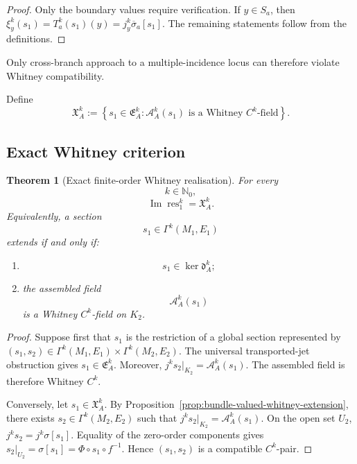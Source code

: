 \documentclass[11pt]{article}
\theoremstyle{plain}
\newtheorem{theorem}{Theorem}[section]
\theoremstyle{definition}
\begin{document}
\begin{proof}
Only the boundary values require verification. If
\(y\in S_a\),
then
\(\xi_y^k(s_1) = T_a^k(s_1)(y) = j_y^k \overline{\sigma}_a[s_1]\).
The remaining statements follow from the definitions.
\end{proof}

Only cross-branch approach to a multiple-incidence locus can therefore violate Whitney compatibility.

Define
\[
  \mathfrak X_A^k
  :=
  \left\{
    s_1\in\mathfrak E_A^k:
    \mathcal A_A^k(s_1)
    \text{ is a Whitney }C^k\text{-field}
  \right\}.
\]

\subsection{Exact Whitney criterion}
\label{subsec:exact-whitney-criterion}

\begin{theorem}[Exact finite-order Whitney realisation]
\label{thm:exact-whitney-realisation}
For every
\[
  k\in\mathbb N_0,
\]
\[
  \boxed{
  \operatorname{Im}\operatorname{res}_1^k
  =
  \mathfrak X_A^k.
  }
\]
Equivalently, a section
\[
  s_1\in\Gamma^k(M_1,E_1)
\]
extends if and only if:

\begin{enumerate}[label=\textup{(\roman*)}]
  \item
        \[
          s_1\in\ker\mathfrak d_A^k;
        \]

  \item the assembled field
        \[
          \mathcal A_A^k(s_1)
        \]
        is a Whitney \(C^k\)-field on \(K_2\).
\end{enumerate}
\end{theorem}

\begin{proof}
Suppose first that \(s_1\) is the restriction of a global section
represented by
\((s_1,s_2) \in \Gamma^k(M_1,E_1) \times \Gamma^k(M_2,E_2)\).
The universal transported-jet obstruction gives
\(s_1\in\mathfrak E_A^k\).
Moreover,
\(j^k s_2|_{K_2} = \mathcal A_A^k(s_1)\).
The assembled field is therefore Whitney \(C^k\).

Conversely, let
\(s_1\in\mathfrak X_A^k\).
By
Proposition~\ref{prop:bundle-valued-whitney-extension},
there exists \(s_2\in\Gamma^k(M_2,E_2)\) such that
\(j^k s_2|_{K_2} = \mathcal A_A^k(s_1)\).
On the open set \(U_2\),
\(j^k s_2 = j^k \sigma[s_1]\).
Equality of the zero-order components gives
\(s_2|_{U_2} = \sigma[s_1] = \Phi\circ s_1\circ f^{-1}\).
Hence \((s_1,s_2)\) is a compatible \(C^k\)-pair.
\end{proof}
\end{document}

